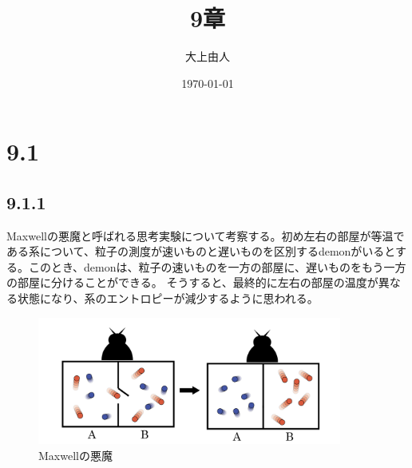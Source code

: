 \documentclass[a4paper,11pt]{jsarticle}
\numberwithin{equation}{section}
\begin{document}
\title{9章}
\author{大上由人}
\date{\today}
\maketitle

\section*{9.1}
\subsection*{9.1.1}
Maxwellの悪魔と呼ばれる思考実験について考察する。初め左右の部屋が等温である系について、粒子の測度が速いものと遅いものを区別するdemonがいるとする。このとき、demonは、粒子の速いものを一方の部屋に、遅いものをもう一方の部屋に分けることができる。
そうすると、最終的に左右の部屋の温度が異なる状態になり、系のエントロピーが減少するように思われる。
\begin{figure}[H]
    \begin{center}
    \includegraphics[width=100mm]{demon.png}
    \end{center}
    \caption{Maxwellの悪魔}
    \label{fig:Maxwelldemon}
\end{figure}
\end{document}
